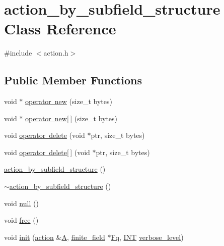 \hypertarget{classaction__by__subfield__structure}{}\section{action\+\_\+by\+\_\+subfield\+\_\+structure Class Reference}
\label{classaction__by__subfield__structure}


{\ttfamily \#include $<$action.\+h$>$}

\subsection*{Public Member Functions}
\begin{DoxyCompactItemize}
\item 
void $\ast$ \mbox{\hyperlink{classaction__by__subfield__structure_abbce0fd5491365c9da79bd9e2ca47860}{operator new}} (size\+\_\+t bytes)
\item 
void $\ast$ \mbox{\hyperlink{classaction__by__subfield__structure_a76c6a2eced74d3dfa0aca44488ebe3da}{operator new\mbox{[}$\,$\mbox{]}}} (size\+\_\+t bytes)
\item 
void \mbox{\hyperlink{classaction__by__subfield__structure_a2647ef0e3a6086190e280a1f1aab8124}{operator delete}} (void $\ast$ptr, size\+\_\+t bytes)
\item 
void \mbox{\hyperlink{classaction__by__subfield__structure_a88a671c2206fe05933599d8e2d456519}{operator delete\mbox{[}$\,$\mbox{]}}} (void $\ast$ptr, size\+\_\+t bytes)
\item 
\mbox{\hyperlink{classaction__by__subfield__structure_a2264cf1d539f265ddf352cbf792bd05d}{action\+\_\+by\+\_\+subfield\+\_\+structure}} ()
\item 
\mbox{\hyperlink{classaction__by__subfield__structure_af098ddf98b64f4848b83f6a129fc2887}{$\sim$action\+\_\+by\+\_\+subfield\+\_\+structure}} ()
\item 
void \mbox{\hyperlink{classaction__by__subfield__structure_aa21cf866b0fed81b1d811c761918fc67}{null}} ()
\item 
void \mbox{\hyperlink{classaction__by__subfield__structure_a91e9012e7d1ce321bd2ee22819890040}{free}} ()
\item 
void \mbox{\hyperlink{classaction__by__subfield__structure_a565b45607d3ebc3eaa0e910a6ce6a661}{init}} (\mbox{\hyperlink{classaction}{action}} \&\mbox{\hyperlink{simeon_8_c_a97833f04c3a9c008df5521a2fc291bb4}{A}}, \mbox{\hyperlink{classfinite__field}{finite\+\_\+field}} $\ast$\mbox{\hyperlink{classaction__by__subfield__structure_aada606f117514b57a445fa19bcbb6c97}{Fq}}, \mbox{\hyperlink{galois_8h_a09fddde158a3a20bd2dcadb609de11dc}{I\+NT}} \mbox{\hyperlink{simeon_8_c_a818073fbcc2f439e7c56952f67386122}{verbose\+\_\+level}})

\end{DoxyCompactItemize}
